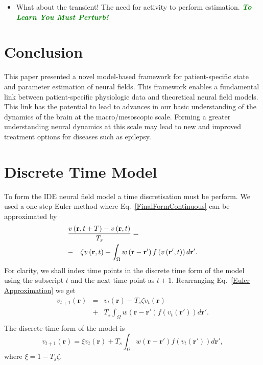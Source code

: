 \documentclass[12pt]{iopart}
\newcommand{\omg}[1]{\textsf{\emph{\textbf{\textcolor{green}{#1}}}}}
\begin{document}
\begin{itemize}
	\item What about the transient! The need for activity to perform estimation. \omg{To Learn You Must Perturb!} 
\end{itemize}

\section{Conclusion}\label{ConclusionSection}
This paper presented a novel model-based framework for patient-specific state and parameter estimation of neural fields. This framework enables a fundamental link between patient-specific physiologic data and theoretical neural field models. This link has the potential to lead to advances in our basic understanding of the dynamics of the brain at the macro/mesoscopic scale. Forming a greater understanding neural dynamics at this scale may lead to new and improved treatment options for diseases such as epilepsy.

\appendix 
\section{Discrete Time Model}\label{Time Discretization} To form the IDE neural field model a time discretisation must be perform. We used a one-step Euler method where Eq.~\ref{FinalFormContinuous} can be approximated by 
\begin{eqnarray}
	\label{Euler Approximation} \lefteqn{\frac{v\left( \mathbf{r},t+T \right) - v\left( \mathbf{r},t\right)}{T_s} =}\nonumber\\
& -&\zeta v\left( \mathbf{r},t \right) + \int_\Omega {w\left( \mathbf{r}-\mathbf{r}' \right)f\left( {v\left( \mathbf{r}',t \right)} \right)d\mathbf{r}'}.\nonumber \\ 
\end{eqnarray}
For clarity, we shall index time points in the discrete time form of the model using the subscript $t$ and the next time point as $t+1$. Rearranging Eq.~\ref{Euler Approximation} we get 
\begin{eqnarray}
	\label{Euler Approximation2} v_{t+1}\left( \mathbf{r}\right) &=& v_t\left( \mathbf{r}\right) -T_s \zeta v_t\left( \mathbf{r}\right)\nonumber \\
&+& T_s \int_\Omega {w\left( \mathbf{r}-\mathbf{r}' \right)f\left( {v_t\left( \mathbf{r}'\right)} \right)d\mathbf{r}'}.\nonumber \\ 
\end{eqnarray}
The discrete time form of the model is 
\begin{equation}
	\label{Discrete Time Model1} v_{t+1}\left(\mathbf{r}\right) = \xi v_t\left(\mathbf{r}\right) + T_s \int_\Omega { w\left(\mathbf{r}-\mathbf{r}'\right) f\left(v_t\left(\mathbf{r}'\right)\right) d\mathbf{r}'}, 
\end{equation}
where $\xi = 1 - T_s \zeta$. 
\end{document}

